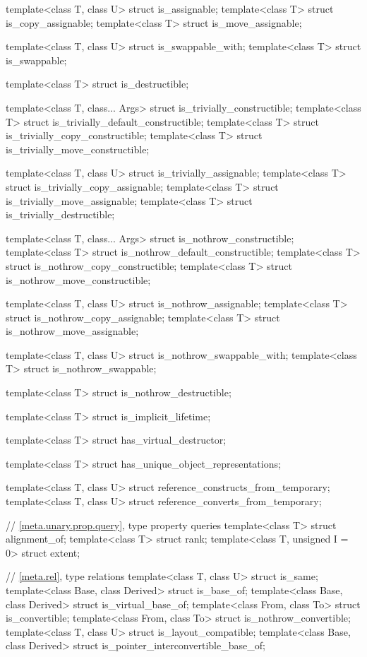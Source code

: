 \begin{codeblock}
{  template<class T, class U> struct is_assignable;
  template<class T> struct is_copy_assignable;
  template<class T> struct is_move_assignable;

  template<class T, class U> struct is_swappable_with;
  template<class T> struct is_swappable;

  template<class T> struct is_destructible;

  template<class T, class... Args> struct is_trivially_constructible;
  template<class T> struct is_trivially_default_constructible;
  template<class T> struct is_trivially_copy_constructible;
  template<class T> struct is_trivially_move_constructible;

  template<class T, class U> struct is_trivially_assignable;
  template<class T> struct is_trivially_copy_assignable;
  template<class T> struct is_trivially_move_assignable;
  template<class T> struct is_trivially_destructible;

  template<class T, class... Args> struct is_nothrow_constructible;
  template<class T> struct is_nothrow_default_constructible;
  template<class T> struct is_nothrow_copy_constructible;
  template<class T> struct is_nothrow_move_constructible;

  template<class T, class U> struct is_nothrow_assignable;
  template<class T> struct is_nothrow_copy_assignable;
  template<class T> struct is_nothrow_move_assignable;

  template<class T, class U> struct is_nothrow_swappable_with;
  template<class T> struct is_nothrow_swappable;

  template<class T> struct is_nothrow_destructible;

  template<class T> struct is_implicit_lifetime;

  template<class T> struct has_virtual_destructor;

  template<class T> struct has_unique_object_representations;

  template<class T, class U> struct reference_constructs_from_temporary;
  template<class T, class U> struct reference_converts_from_temporary;

  // \ref{meta.unary.prop.query}, type property queries
  template<class T> struct alignment_of;
  template<class T> struct rank;
  template<class T, unsigned I = 0> struct extent;

  // \ref{meta.rel}, type relations
  template<class T, class U> struct is_same;
  template<class Base, class Derived> struct is_base_of;
  template<class Base, class Derived> struct is_virtual_base_of;
  template<class From, class To> struct is_convertible;
  template<class From, class To> struct is_nothrow_convertible;
  template<class T, class U> struct is_layout_compatible;
  template<class Base, class Derived> struct is_pointer_interconvertible_base_of;

}
\end{codeblock}
